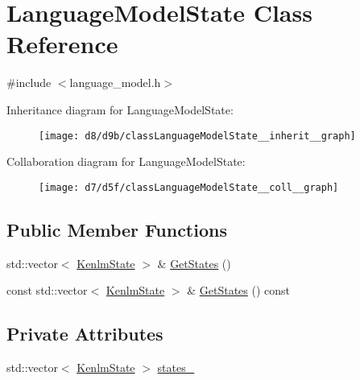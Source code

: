 \hypertarget{classLanguageModelState}{}\section{Language\+Model\+State Class Reference}
\label{classLanguageModelState}


{\ttfamily \#include $<$language\+\_\+model.\+h$>$}



Inheritance diagram for Language\+Model\+State\+:
\nopagebreak
\begin{figure}[H]
\begin{center}
\leavevmode
\texttt{[image: d8/d9b/classLanguageModelState\_\_inherit\_\_graph]}
\end{center}
\end{figure}


Collaboration diagram for Language\+Model\+State\+:
\nopagebreak
\begin{figure}[H]
\begin{center}
\leavevmode
\texttt{[image: d7/d5f/classLanguageModelState\_\_coll\_\_graph]}
\end{center}
\end{figure}
\subsection*{Public Member Functions}
\begin{DoxyCompactItemize}
\item 
std\+::vector$<$ \hyperlink{kenlm_8h_ac0671733f284e84250e464637645ade4}{Kenlm\+State} $>$ \& \hyperlink{classLanguageModelState_ae897bc00787b0bfdb26d30ff12c17843}{Get\+States} ()
\item 
const std\+::vector$<$ \hyperlink{kenlm_8h_ac0671733f284e84250e464637645ade4}{Kenlm\+State} $>$ \& \hyperlink{classLanguageModelState_aa66029c2e0a4dd167f15783bddaf7133}{Get\+States} () const 
\end{DoxyCompactItemize}
\subsection*{Private Attributes}
\begin{DoxyCompactItemize}
\item 
std\+::vector$<$ \hyperlink{kenlm_8h_ac0671733f284e84250e464637645ade4}{Kenlm\+State} $>$ \hyperlink{classLanguageModelState_a725ff1669df2fff270866b28d2c02c42}{states\+\_\+}
\end{DoxyCompactItemize}


